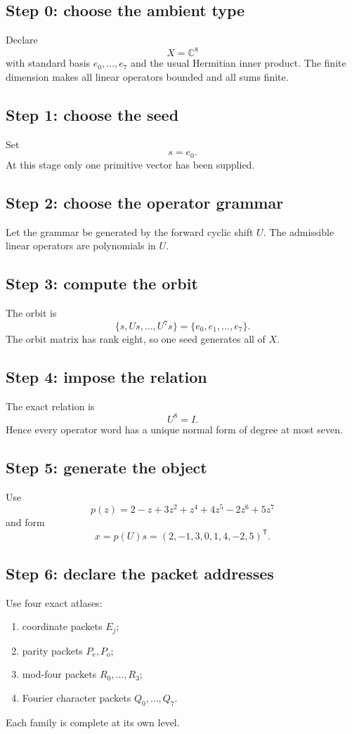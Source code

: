 \documentclass[11pt,oneside]{book}
\theoremstyle{definition}
\theoremstyle{remark}
\newcommand{\C}{\mathbb C}
\begin{document}
\subsection{Step 0: choose the ambient type}
Declare
\[
X=\C^8
\]
with standard basis $e_0,\ldots,e_7$ and the usual Hermitian inner product.  The finite dimension makes all linear operators bounded and all sums finite.

\subsection{Step 1: choose the seed}
Set
\[
s=e_0.
\]
At this stage only one primitive vector has been supplied.

\subsection{Step 2: choose the operator grammar}
Let the grammar be generated by the forward cyclic shift $U$.  The admissible linear operators are polynomials in $U$.

\subsection{Step 3: compute the orbit}
The orbit is
\[
\{s,Us,\ldots,U^7s\}
=
\{e_0,e_1,\ldots,e_7\}.
\]
The orbit matrix has rank eight, so one seed generates all of $X$.

\subsection{Step 4: impose the relation}
The exact relation is
\[
U^8=I.
\]
Hence every operator word has a unique normal form of degree at most seven.

\subsection{Step 5: generate the object}
Use
\[
p(z)=2-z+3z^2+z^4+4z^5-2z^6+5z^7
\]
and form
\[
x=p(U)s=(2,-1,3,0,1,4,-2,5)^{\mathsf T}.
\]

\subsection{Step 6: declare the packet addresses}
Use four exact atlases:
\begin{enumerate}[label=(\alph*),leftmargin=2em]
\item coordinate packets $E_j$;
\item parity packets $P_{\mathrm e},P_{\mathrm o}$;
\item mod-four packets $R_0,\ldots,R_3$;
\item Fourier character packets $Q_0,\ldots,Q_7$.
\end{enumerate}
Each family is complete at its own level.
\end{document}
